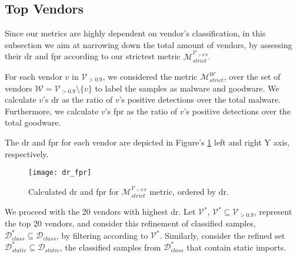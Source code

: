 

\subsection{Top Vendors}

Since our metrics are highly dependent on vendor's classification, in this subsection we aim at narrowing down the total amount of vendors, by assessing their \gls{dr} and \gls{fpr} according to our strictest metric $\mathcal{M}_{strict}^{\mathcal{V}_{>0.9}}$.

For each vendor $v$ in $\mathcal{V}_{>0.9}$, we considered the metric $\mathcal{M}_{strict}^{\mathcal{W}}$, over the set of vendors $\mathcal{W} = \mathcal{V}_{>0.9}\setminus \{v\}$ to label the samples as malware and goodware. We calculate $v$'s \gls{dr} as the ratio of $v$'s positive detections over the total malware. Furthermore, we calculate $v$'s \gls{fpr} as the ratio of $v$'s positive detections over the total goodware.

The \gls{dr} and \gls{fpr} for each vendor are depicted in Figure's \ref{fig:dr_fpr} left and right Y axis, respectively.

\begin{figure}[!h]
	\centering
	\texttt{[image: dr\_fpr]}
	\caption{Calculated \gls{dr} and \gls{fpr} for $\mathcal{M}_{strict}^{\mathcal{V}_{>0.9}}$ metric, ordered by \gls{dr}.}
	\label{fig:dr_fpr}
\end{figure}

We proceed with the 20 vendors with highest \gls{dr}. Let $\mathcal{V}^*$, $\mathcal{V}^* \subseteq \mathcal{V}_{>0.9}$, represent the top 20 vendors, and consider this refinement of classified samples, $\mathcal{D}_{class}^* \subseteq \mathcal{D}_{class}$, by filtering according to $\mathcal{V}^*$. Similarly, consider the refined set $\mathcal{D}_{static}^* \subseteq \mathcal{D}_{static}$, the classified samples from $\mathcal{D}_{class}^*$ that contain static imports.